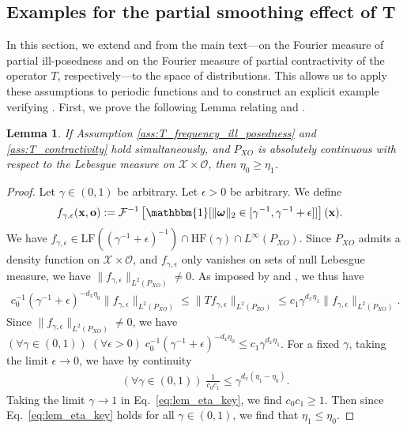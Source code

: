 \documentclass[11pt]{article}
\newcommand{\one}{\mathbbm{1}}
\newcommand{\bx}{\mathbf x}
\newcommand{\bo}{\mathbf o}
\newcommand{\bomega}{\boldsymbol{\omega}}
\newcommand{\calO}{\mathcal{O}}
\newcommand{\calX}{\mathcal{X}}
\newcommand{\0}{\mathbf{0}}
\newtheorem{lem}{Lemma}[section]
\begin{document}
\begin{appendix}
\section{Examples for the partial smoothing effect of T}
\label{sec:appendix_examples}
In this section, we extend  and  from the main text—on the Fourier measure of partial ill-posedness and on the Fourier measure of partial contractivity of the operator $T$, respectively—to the space of distributions. This allows us to apply these assumptions to periodic functions and to construct an explicit example verifying . First, we prove the following Lemma relating  and . 
\begin{lem}\label{lem:eta_0_eta_1_appendix}
If Assumption \ref{ass:T_frequency_ill_posedness} and \ref{ass:T_contractivity} hold simultaneously, and $P_{XO}$ is absolutely continuous with respect to the Lebesgue measure on $\calX\times\calO$, then $\eta_0\geq \eta_1$.
\end{lem}
\begin{proof}
Let $\gamma\in (0,1)$ be arbitrary. Let $\epsilon  > 0$ be arbitrary. We define
\begin{align*}
    f_{\gamma, \epsilon}(\bx,\bo) &:= \mathcal{F}^{-1}\left[\one[\|\bomega\|_2 \in [\gamma^{-1}, \gamma^{-1}+\epsilon]]\right](\bx). 
\end{align*}
We have $f_{\gamma,\epsilon}\in \mathrm{LF}\left((\gamma^{-1} + \epsilon)^{-1}\right)\cap \mathrm{HF}(\gamma)\cap L^{\infty}(P_{XO})$. Since $P_{XO}$ admits a density function on $\calX\times \calO$, and $f_{\gamma,\epsilon}$ only vanishes on sets of null Lebesgue measure, we have $\|f_{\gamma,\epsilon}\|_{L^2(P_{XO})}\neq 0$. As imposed by  and , we thus have
\begin{align*}
    c_0^{-1} \left(\gamma^{-1} + \epsilon\right)^{-d_x\eta_0}\|f_{\gamma,\epsilon}\|_{L^2(P_{XO})}
\leq \|Tf_{\gamma,\epsilon}\|_{L^2(P_{ZO})} \leq c_1 \gamma^{d_x\eta_1}\|f_{\gamma,\epsilon}\|_{L^2(P_{XO})}.
\end{align*}
Since $\|f_{\gamma,\epsilon}\|_{L^2(P_{XO})}\neq 0$, we have $(\forall \gamma\in (0,1))\;(\forall \epsilon >0)\; c_0^{-1}\left(\gamma^{-1} + \epsilon\right)^{-d_x\eta_0} \leq c_1 \gamma^{d_x\eta_1}$. For a fixed $\gamma$, taking the limit $\epsilon \to 0$, we have by continuity
\begin{align}
\label{eq:lem_eta_key}
   (\forall \gamma\in (0,1))\; \frac{1}{c_0 c_1}\leq \gamma^{d_x(\eta_1-\eta_0)}.
\end{align}
Taking the limit $\gamma\to 1$ in Eq.~\eqref{eq:lem_eta_key}, we find $c_0c_1 \geq 1$. Then since Eq.~\eqref{eq:lem_eta_key} holds for all $\gamma\in (0,1)$, we find that $\eta_1\leq \eta_0$. 
\end{proof}


\end{appendix}
\end{document}
